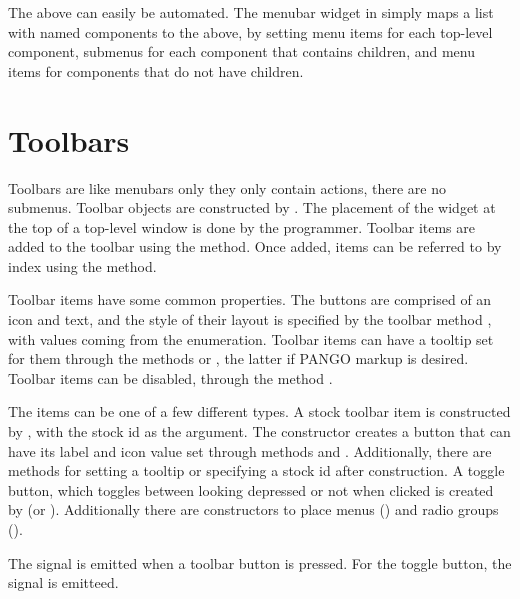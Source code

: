 The above can easily be automated. The menubar widget in
 simply maps a list with named components to the
above, by setting menu items for each top-level component, submenus for
each component that contains children, and menu items for components
that do not have children. 

\section{Toolbars}
\label{sec:RGtk2:toolbars}

Toolbars are like menubars only they only contain actions, there are
no submenus. Toolbar objects are constructed by
. The placement of the widget at the top of a
top-level window is done by the programmer. Toolbar items are added to
the toolbar using the  method. Once added,
items can be referred to by index using the \code{[[} method.

Toolbar items have some common properties. The buttons are comprised
of an icon and text, and the style of their layout is specified by the
toolbar method , with values coming from
the  enumeration. Toolbar items can have a
tooltip set for them through the methods
 or
, the latter if PANGO markup is
desired. Toolbar items can be disabled, through the method
.

The items can be one of a few different types. A stock toolbar item is
constructed by , with the
stock id as the argument. The constructor
 creates a button that can have its
label and icon value set through methods
 and
. Additionally, there are
methods for setting a tooltip or specifying a stock id after
construction. A toggle button, which toggles between looking depressed
or not when clicked is created by 
(or ).  Additionally
there are constructors to place menus
() and radio groups
().
  
The  signal is emitted when a toolbar button is
pressed. For the toggle button, the  signal is
emitteed.



